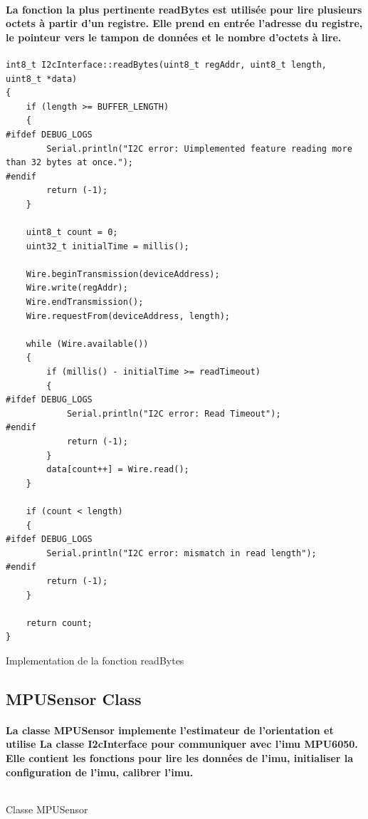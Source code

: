 \paragraph{La fonction la plus pertinente readBytes est utilisée pour lire plusieurs octets à partir d'un registre. Elle prend en entrée l'adresse du registre, le pointeur vers le tampon de données et le nombre d'octets à lire.}
\newpage
\begin{listing}[!htpb]
	\begin{verbatim}
int8_t I2cInterface::readBytes(uint8_t regAddr, uint8_t length, uint8_t *data)
{
	if (length >= BUFFER_LENGTH)
	{
#ifdef DEBUG_LOGS
		Serial.println("I2C error: Uimplemented feature reading more than 32 bytes at once.");
#endif
		return (-1);
	}

	uint8_t count = 0;
	uint32_t initialTime = millis();

	Wire.beginTransmission(deviceAddress);
	Wire.write(regAddr);
	Wire.endTransmission();
	Wire.requestFrom(deviceAddress, length);

	while (Wire.available())
	{
		if (millis() - initialTime >= readTimeout)
		{
#ifdef DEBUG_LOGS
			Serial.println("I2C error: Read Timeout");
#endif
			return (-1);
		}
		data[count++] = Wire.read();
	}

	if (count < length)
	{
#ifdef DEBUG_LOGS
		Serial.println("I2C error: mismatch in read length");
#endif
		return (-1);
	}

	return count;
}
	\end{verbatim}
	\caption{Implementation de la fonction readBytes}
	\label{listing:read-bytes}
\end{listing}



\subsection{MPUSensor Class}

\paragraph{La classe MPUSensor implemente l'estimateur de l'orientation et utilise La classe I2cInterface pour communiquer avec l'\gls{imu} MPU6050. Elle contient les fonctions pour lire les données de l'\gls{imu}, initialiser la configuration de l'\gls{imu}, calibrer l'\gls{imu}.}
\begin{listing}[!htpb]
	\inputminted{cpp}{Code/MPUSensor.h}
	\caption{Classe MPUSensor}
	\label{listing:mpu-sensor}
\end{listing}


